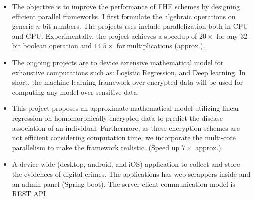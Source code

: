 







\vspace{-5pt}

    \begin{itemize}
        \item The objective is to improve the performance of FHE schemes by designing efficient parallel frameworks. I first formulate the algebraic operations on generic $n$-bit numbers. The projects uses include parallelization both in CPU and GPU. Experimentally, the project achieves a speedup of $20\times$ for any 32-bit boolean operation and $14.5\times$ for multiplications (approx.).
        \item The ongoing projects are to device extensive mathematical model for exhaustive computations such as: Logistic Regression, and Deep learning. In short, the machine learning framework over encrypted data will be used for computing any model over sensitive data.
    \end{itemize}
    
    \begin{itemize}
        \item This project proposes an approximate mathematical model utilizing linear regression on homomorphically encrypted data to predict the disease association of an individual. Furthermore, as these encryption schemes are not efficient considering computation time, we incorporate the multi-core parallelism to make the framework realistic. (Speed up $7\times$ approx.).
    \end{itemize}


\vspace{-5pt}
\begin{itemize}
    \item A device wide (desktop, android, and iOS) application to collect and store the evidences of digital crimes. The applications has web scrappers inside and an admin panel (Spring boot). The server-client communication model is REST API.
\end{itemize}

